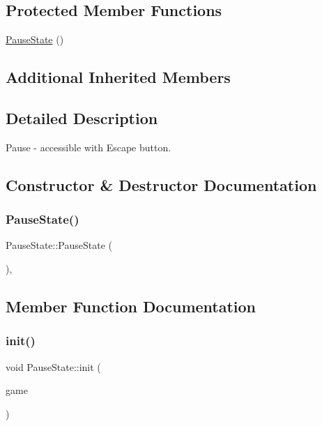 \subsection*{Protected Member Functions}
\begin{DoxyCompactItemize}
\item 
\mbox{\hyperlink{class_pause_state_ad136b9cd4e853606498c01aeeb6a9d26}{Pause\+State}} ()
\end{DoxyCompactItemize}
\subsection*{Additional Inherited Members}


\subsection{Detailed Description}
Pause -\/ accessible with Escape button. 

\subsection{Constructor \& Destructor Documentation}
\mbox{\label{class_pause_state_ad136b9cd4e853606498c01aeeb6a9d26}} 
\subsubsection{\texorpdfstring{PauseState()}{PauseState()}}
{\footnotesize\ttfamily Pause\+State\+::\+Pause\+State (\begin{DoxyParamCaption}{ }\end{DoxyParamCaption})\hspace{0.3cm}{\ttfamily [inline]}, {\ttfamily [protected]}}



\subsection{Member Function Documentation}
\mbox{\label{class_pause_state_a1e3378e3a16fc37c87c12f854d86005b}} 
\subsubsection{\texorpdfstring{init()}{init()}}
{\footnotesize\ttfamily void Pause\+State\+::init (\begin{DoxyParamCaption}\item[{\mbox{\hyperlink{class_game_engine}{Game\+Engine}} $\ast$}]{game }\end{DoxyParamCaption})\hspace{0.3cm}{\ttfamily [virtual]}}



